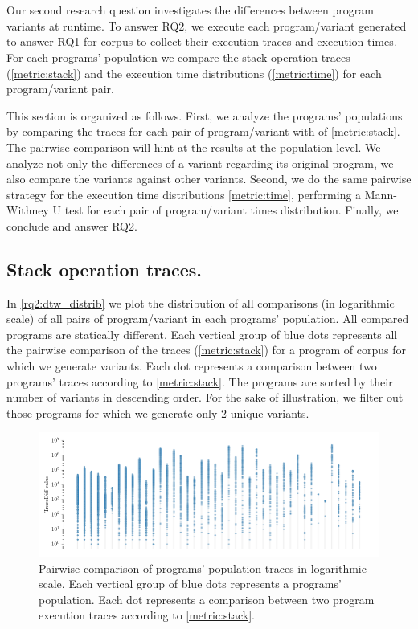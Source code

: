 \section{\rqtwo}



Our second research question investigates the differences between program variants at runtime.
To answer RQ2, we execute each program/variant generated to answer RQ1 for \corpusrosetta corpus to collect their execution traces and execution times.
For each programs' population we compare the stack operation traces (\autoref{metric:stack}) and the execution time distributions (\autoref{metric:time}) for each program/variant pair.

This section is organized as follows. First, we analyze the programs' populations by comparing the traces for each pair of program/variant with \DTW of \autoref{metric:stack}. The pairwise comparison will hint at the results at the population level. We analyze not only the differences of a variant regarding its original program, we also compare the variants against other variants. Second, we do the same pairwise strategy for the execution time distributions \autoref{metric:time}, performing a Mann-Withney U test for each pair of program/variant times distribution. Finally, we conclude and answer RQ2.

\subsection*{Stack operation traces.}


In \autoref{rq2:dtw_distrib} we plot the distribution of all comparisons (in logarithmic scale) of all pairs of program/variant in each programs' population. All compared programs are statically different. Each vertical group of blue dots  represents all the pairwise comparison of the traces (\autoref{metric:stack}) for a program of \corpusrosetta corpus for which we generate variants.
Each dot represents a comparison between two programs' traces according to \autoref{metric:stack}. 
The programs are sorted by their number of variants in descending order. For the sake of illustration, we filter out those programs for which we generate only 2 unique variants. 

\begin{figure}[h]
    \centering
    \includegraphics[width=\linewidth]{plots/plot_distribs1.png}
    \caption{Pairwise comparison of programs' population traces in logarithmic scale. Each vertical group of blue dots represents a programs' population. Each dot represents a comparison between two program execution traces according to \autoref{metric:stack}. }
    \label{rq2:dtw_distrib}
\end{figure}

